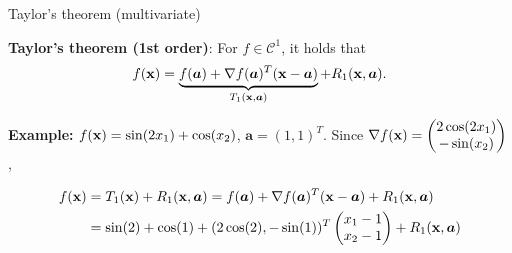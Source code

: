 \documentclass[11pt,compress,t,notes=noshow, xcolor=table]{beamer}
\begin{document}
\begin{vbframe}{Taylor's theorem (multivariate)}

\vspace{-\baselineskip}


\textbf{Taylor's theorem (1st order)}: For $f\in\mathcal{C}^1$, it holds that
\begin{equation*}
    f(\mathbf{x}) = \underbrace{f(\bm{a}) + \nabla f(\bm{a})^T (\mathbf{x} - \bm{a})}_{T_1(\mathbf{x}, \bm{a})} + R_1(\mathbf{x},\bm{a}).
\end{equation*}


\begin{footnotesize}
    \textbf{Example: } $f(\mathbf{x}) = \sin(2x_1) + \cos(x_2)$, $\bm{a} = (1, 1)^T$.
    Since $\nabla f(\mathbf{x}) = \begin{pmatrix}2\cos(2x_1) \\ -\sin(x_2)\end{pmatrix}$,

    \vspace{-0.7\baselineskip}

    \begin{align*}
        f(\mathbf{x}) &= T_1(\mathbf{x}) + R_1(\mathbf{x}, \bm{a}) = f(\bm{a}) + \nabla f(\bm{a})^T (\mathbf{x} - \bm{a}) + R_1(\mathbf{x}, \bm{a})\\
        &= \sin(2) + \cos(1) + (2 \cos(2), - \sin(1))^T\begin{pmatrix} x_1 - 1 \\ x_2 - 1\end{pmatrix} + R_1(\mathbf{x}, \bm{a})
    \end{align*}
\end{footnotesize}

\vspace*{-0.5\baselineskip}


\end{vbframe}
\end{document}
